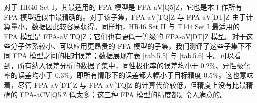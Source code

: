 \begin{table}[!ht]
\centering
\caption[HR46 与 T144 数据集分割情况]{HR46 与 T144 数据集依 CCSD(T) 计算能力限制的分割总体情况、以及分割后子集在计算极化率时对应使用的 FPA 模型。}
\label{tab.5.4}
\end{table}

对于 HR46 Set I，其最适用的 FPA 模型是 FPA-aV[Q5]Z，它也是本工作所有 FPA 模型近似中最精确的。对于该子集，FPA-aV[TQ]Z 与 FPA-aV[DT]Z 由于计算量小，数据因此较容易获得。同样地，HR46 Set II 与 T144 Set I 最适用的 FPA 模型是 FPA-aV[TQ]Z；它们也有更低一等级的 FPA-aV[DT]Z 模型。对于这些分子体系较小、可以应用更昂贵的 FPA 模型的子集，我们测评了这些子集下不同 FPA 模型之间的相对误差；数据展现在表 \ref{tab.5.5} 与 \ref{tab.5.6} 中。可以看到，所有纳入误差分析的数据子集中，同性极化率的误差均小于 0.2\%、异性极化率的误差均小于 0.3\%，即所有情形下的误差都大幅小于目标精度 0.5\%。这也意味着，尽管 FPA-aV[DT]Z 与 FPA-aV[TQ]Z 的计算代价较低，但精度上没有比最精确的 FPA-aCV[Q5]Z 低太多；这三种 FPA 模型的精度都是令人满意的。

\begin{table}[!ht]
\centering
\caption[HR46 与 T144 子集 $\symup{\Delta} \tilde \alpha_\textsf{CCSD(T)}$ 在不同 FPA 模型下 RelRMSD]{HR46 与 T144 子集下同性极化率 $\symup{\Delta} \tilde \alpha_\textsf{CCSD(T)}$ 在不同 FPA 模型下的相对方均根误差\textrm{\textsuperscript{\emph{a}}}。}
\label{tab.5.5}
\end{table}

